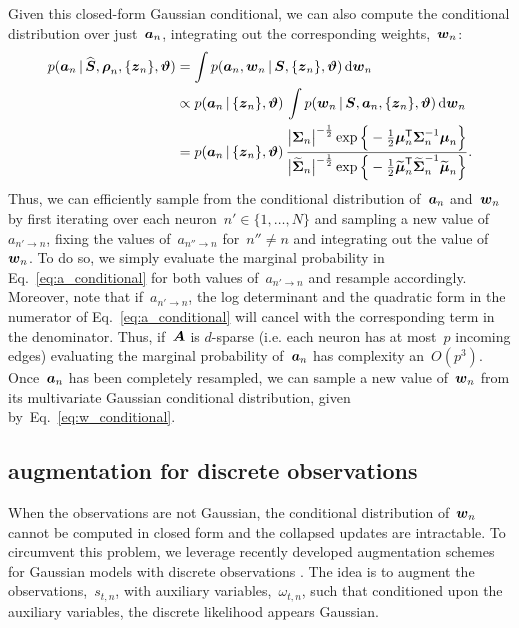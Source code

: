 Given this closed-form Gaussian conditional, we can also compute
the conditional distribution over just~$\boldsymbol{a}_n$, integrating out
the corresponding weights,~$\boldsymbol{w}_n$:
\begin{align}
  \nonumber
  p(\boldsymbol{a}_n \,|\, \widehat{\boldsymbol{S}}, \boldsymbol{\rho}_n, \{\boldsymbol{z}_n\}, \boldsymbol{\vartheta})
  &= \int p(\boldsymbol{a}_n, \boldsymbol{w}_n \,|\, {\boldsymbol{S}}, \{\boldsymbol{z}_n\}, \boldsymbol{\vartheta}) \, \mathrm{d} \boldsymbol{w}_n \\
  \nonumber
  &\propto p(\boldsymbol{a}_n \,|\, \{\boldsymbol{z}_n\}, \boldsymbol{\vartheta}) \, \int p(\boldsymbol{w}_n \,|\, {\boldsymbol{S}}, \boldsymbol{a}_n, \{\boldsymbol{z}_n\}, \boldsymbol{\vartheta}) \, \mathrm{d} \boldsymbol{w}_n \\
  \label{eq:a_conditional}
  &= p(\boldsymbol{a}_n \,|\, \{\boldsymbol{z}_n\}, \boldsymbol{\vartheta}) \, \frac{\big| \boldsymbol{\Sigma}_n \big|^{-\frac{1}{2}} \exp \Big \{-\frac{1}{2} \boldsymbol{\mu}_n^{\mathsf{T}} \boldsymbol{\Sigma}_n^{-1} \boldsymbol{\mu}_n \Big \} }
  {\big| \widetilde{\boldsymbol{\Sigma}}_n \big|^{-\frac{1}{2}} \exp \Big \{-\frac{1}{2} \widetilde{\boldsymbol{\mu}}_n^{\mathsf{T}} \widetilde{\boldsymbol{\Sigma}}_n^{-1} \widetilde{\boldsymbol{\mu}}_n \Big \}}.
\end{align}
Thus, we can efficiently sample from the conditional
distribution of~$\boldsymbol{a}_n$ and~$\boldsymbol{w}_n$ by first iterating
over each neuron~${n' \in \{1, \ldots, N\}}$ and sampling
a new value of~$a_{n' \to n}$, fixing the values of~$a_{n'' \to n}$
for~$n'' \neq n$ and integrating out the value of~$\boldsymbol{w}_n$.
To do so, we simply evaluate the marginal probability in Eq.~\ref{eq:a_conditional}
for both values of~$a_{n' \to n}$ and resample accordingly.
Moreover, note that if~$a_{n' \to n}$, the log determinant and the quadratic
form in the numerator of Eq.~\ref{eq:a_conditional} will cancel with the
corresponding term in the denominator. Thus, if~$\boldsymbol{A}$ is $d$-sparse (i.e. 
each neuron  has at most~$p$ incoming edges) evaluating
the marginal probability of~$\boldsymbol{a}_n$ has complexity an~$O(p^3)$.
Once~$\boldsymbol{a}_n$ has been completely
resampled, we can sample a new value of~$\boldsymbol{w}_n$ from its multivariate
Gaussian conditional distribution, given by~Eq.~\ref{eq:w_conditional}.

\subsection{\polyagamma augmentation for discrete observations}
When the observations are not Gaussian, the conditional distribution
of~$\boldsymbol{w}_n$ cannot be computed in closed form and the collapsed
updates are intractable. To circumvent this problem, we leverage
recently developed augmentation schemes for Gaussian models with
discrete observations \cite{polson2013bayesian, Pillow2012}. The
idea is to augment the observations,~$s_{t,n}$, with auxiliary
variables,~$\omega_{t,n}$, such that conditioned upon the
auxiliary variables, the discrete likelihood appears Gaussian.

